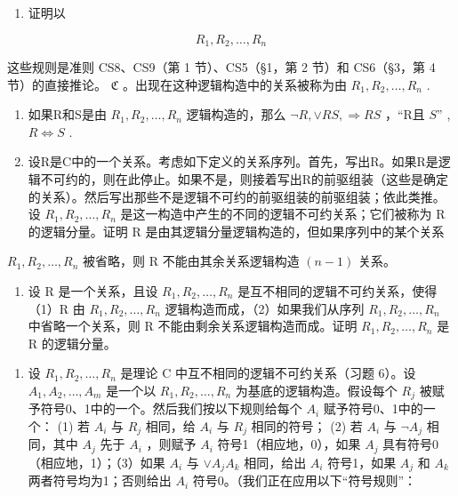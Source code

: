 \begin{enumerate}
\def\labelenumi{(\alph{enumi})}
\tightlist
\item
  证明以
\end{enumerate}

\[
R _ {1}, R _ {2}, \dots , R _ {n}
\]

这些规则是准则 CS8、CS9（第 1 节）、CS5（§1，第 2 节）和 CS6（§3，第 4 节）的直接推论。 \(\mathfrak{C}\) 。出现在这种逻辑构造中的关系被称为由 \(R_{1}, R_{2}, \ldots, R_{n}\) .

\begin{enumerate}
\def\labelenumi{(\alph{enumi})}
\setcounter{enumi}{1}
\item
  如果R和S是由 \(R_{1}, R_{2}, \ldots, R_{n}\) 逻辑构造的，那么 \(\neg R, \vee RS, \Longrightarrow RS\) ，“R且 \(S\)'' , \(R \Longleftrightarrow S\) .
\item
  设R是C中的一个关系。考虑如下定义的关系序列。首先，写出R。如果R是逻辑不可约的，则在此停止。如果不是，则接着写出R的前驱组装（这些是确定的关系）。然后写出那些不是逻辑不可约的前驱组装的前驱组装；依此类推。设 \(R_{1}, R_{2}, \ldots, R_{n}\) 是这一构造中产生的不同的逻辑不可约关系；它们被称为 R 的逻辑分量。证明 R 是由其逻辑分量逻辑构造的，但如果序列中的某个关系
\end{enumerate}

\(R_{1}, R_{2}, \ldots, R_{n}\) 被省略，则 R 不能由其余关系逻辑构造 \((n - 1)\) 关系。

\begin{enumerate}
\def\labelenumi{(\alph{enumi})}
\setcounter{enumi}{3}
\tightlist
\item
  设 R 是一个关系，且设 \(R_{1}, R_{2}, \ldots, R_{n}\) 是互不相同的逻辑不可约关系，使得（1）R 由 \(R_{1}, R_{2}, \ldots, R_{n}\) 逻辑构造而成，（2）如果我们从序列 \(R_{1}, R_{2}, \ldots, R_{n}\) 中省略一个关系，则 R 不能由剩余关系逻辑构造而成。证明 \(R_{1}, R_{2}, \ldots, R_{n}\) 是 R 的逻辑分量。
\end{enumerate}

\begin{enumerate}
\def\labelenumi{\arabic{enumi}.}
\setcounter{enumi}{6}
\tightlist
\item
  设 \(R_{1}, R_{2}, \ldots, R_{n}\) 是理论 C 中互不相同的逻辑不可约关系（习题 6）。设 \(A_{1}, A_{2}, \ldots, A_{m}\) 是一个以 \(R_{1}, R_{2}, \ldots, R_{n}\) 为基底的逻辑构造。假设每个 \(R_{j}\) 被赋予符号0、1中的一个。然后我们按以下规则给每个 \(A_{i}\) 赋予符号0、1中的一个： (1) 若 \(A_{i}\) 与 \(R_{j}\) 相同，给 \(A_{i}\) 与 \(R_{j}\) 相同的符号； (2) 若 \(A_{i}\) 与 \(\neg A_{j}\) 相同，其中 \(A_{j}\) 先于 \(A_{i}\) ，则赋予 \(A_{i}\) 符号1（相应地，0），如果 \(A_{j}\) 具有符号0（相应地，1）；（3）如果 \(A_{i}\) 与 \(\vee A_{j}A_{k}\) 相同，给出 \(A_{i}\) 符号1，如果 \(A_{j}\) 和 \(A_{k}\) 两者符号均为1；否则给出 \(A_{i}\) 符号0。（我们正在应用以下“符号规则”：
\end{enumerate}

